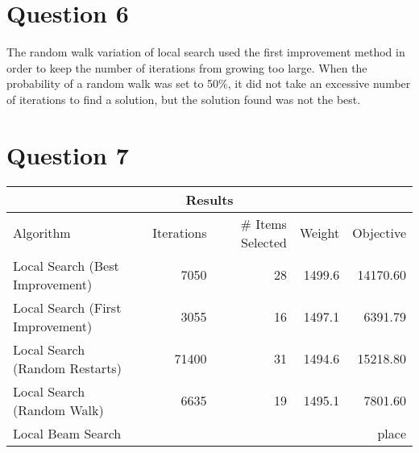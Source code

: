 \documentclass[12pt, letterpaper]{article}
\begin{document}
\section*{Question 6}

The random walk variation of local search used the first improvement method in order to keep the number of iterations from growing too large. When the probability of a random walk was set to 50\%, it did not take an excessive number of iterations to find a solution, but the solution found was not the best. 


\section*{Question 7}

\begin{center}
\begin{tabular}{ l r r r r } 

 \multicolumn{5}{c}{Results} \\
 \hline
Algorithm & Iterations & \# Items Selected & Weight & Objective \\
 \hline 
Local Search (Best Improvement) & 7050 & 28 & 1499.6 & 14170.60 \\
Local Search (First Improvement) & 3055 & 16 & 1497.1 & 6391.79\\
Local Search (Random Restarts) & 71400 & 31 & 1494.6 & 15218.80\\
Local Search (Random Walk) & 6635 & 19 & 1495.1 & 7801.60\\
Local Beam Search & & & & place\\
 \hline
\end{tabular}
\end{center}
\end{document}
